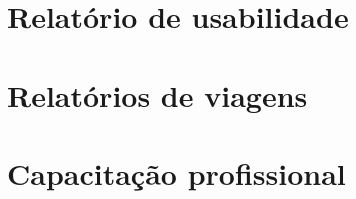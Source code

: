 \documentclass[a4paper,11pt,oneside,brazilian,
draft=false]{report}%
\begin{document}
\chapter{Relatório de usabilidade}


\chapter{Relatórios de viagens} 





%



% 



%



%



\chapter{Capacitação profissional}


\end{document}
